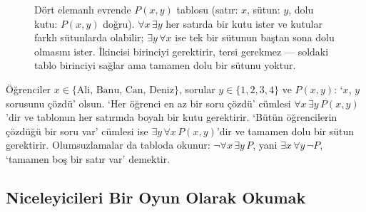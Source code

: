 \begin{figure}[htbp]
\centering
{}%
\caption{Dört elemanlı evrende $P(x,y)$ tablosu (satır: $x$, sütun: $y$, dolu kutu: $P(x,y)$ doğru). $\forall x\,\exists y$ her satırda bir kutu ister ve kutular farklı sütunlarda olabilir; $\exists y\,\forall x$ ise tek bir sütunun baştan sona dolu olmasını ister. İkincisi birinciyi gerektirir, tersi gerekmez — soldaki tablo birinciyi sağlar ama tamamen dolu bir sütunu yoktur.}
\end{figure}

\begin{ornek}
Öğrenciler $x\in\{\text{Ali, Banu, Can, Deniz}\}$, sorular $y\in\{1,2,3,4\}$ ve $P(x,y)$: ‘$x$, $y$ sorusunu çözdü’ olsun. ‘Her öğrenci en az bir soru çözdü’ cümlesi $\forall x\,\exists y\,P(x,y)$’dir ve tablonun her satırında boyalı bir kutu gerektirir. ‘Bütün öğrencilerin çözdüğü bir soru var’ cümlesi ise $\exists y\,\forall x\,P(x,y)$’dir ve tamamen dolu bir sütun gerektirir. Olumsuzlamalar da tabloda okunur: $\neg\forall x\,\exists y\,P$, yani $\exists x\,\forall y\,\neg P$, ‘tamamen boş bir satır var’ demektir.
\end{ornek}

\subsection{Niceleyicileri Bir Oyun Olarak Okumak}

